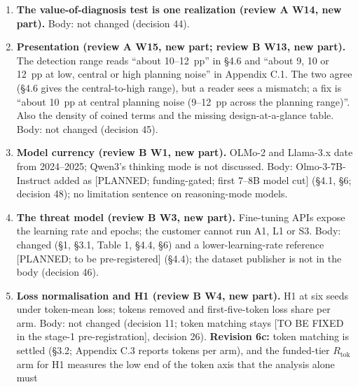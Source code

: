 \documentclass{article}
\theoremstyle{plain}
\theoremstyle{definition}
\theoremstyle{remark}
\begin{document}
\begin{enumerate}
{        W13, new).} Informative missingness. Body: not changed (decision 44).
        \textbf{Revision 6d:} LW-09 settles it in the sources (the tested label
        stays, with a flag); \S{}4.2 still says ``is not read'' (decision 53).
        \textbf{Revision 6e:} answered: the arm is read and keeps its tested
        label with a flag (\S{}4.2; Appendix C.11). The pooled bar was chosen
        after $a_0$'s screen rates were read (DRAFT \S{}3.7), which the stage-1
        record discloses.
  \item \textbf{The value-of-diagnosis test is one realization (review A W14,
        new part).} Body: not changed (decision 44).
  \item \textbf{Presentation (review A W15, new part; review B W13, new part).}
        The detection range reads ``about 10--12~pp'' in \S{}4.6 and ``about 9,
        10 or 12~pp at low, central or high planning noise'' in Appendix C.1.
        The two agree (\S{}4.6 gives the central-to-high range), but a reader
        sees a mismatch; a fix is ``about 10~pp at central planning noise
        (9--12~pp across the planning range)''. Also the density of coined terms
        and the missing design-at-a-glance table. Body: not changed (decision
        45).
  \item \textbf{Model currency (review B W1, new part).} OLMo-2 and Llama-3.x
        date from 2024--2025; Qwen3's thinking mode is not discussed. Body:
        Olmo-3-7B-Instruct added as [PLANNED; funding-gated; first 7--8B model
        cut] (\S{}4.1, \S{}6; decision 48); no limitation sentence on
        reasoning-mode models.
  \item \textbf{The threat model (review B W3, new part).} Fine-tuning APIs
        expose the learning rate and epochs; the customer cannot run A1, L1 or
        S3. Body: changed (\S{}1, \S{}3.1, Table 1, \S{}4.4, \S{}6) and a
        lower-learning-rate reference [PLANNED; to be pre-registered] (\S{}4.4);
        the dataset publisher is not in the body (decision 46).
  \item \textbf{Loss normalisation and H1 (review B W4, new part).} H1 at six
        seeds under token-mean loss; tokens removed and first-five-token loss
        share per arm. Body: not changed (decision 11; token matching stays [TO
        BE FIXED in the stage-1 pre-registration], decision 26).
        \textbf{Revision 6c:} token matching is settled (\S{}3.2; Appendix C.3
        reports tokens per arm), and the funded-tier $R_{\mathrm{tok}}$ arm for
        H1 measures the low end of the token axis that the analysis alone must

\end{enumerate}
\end{document}
